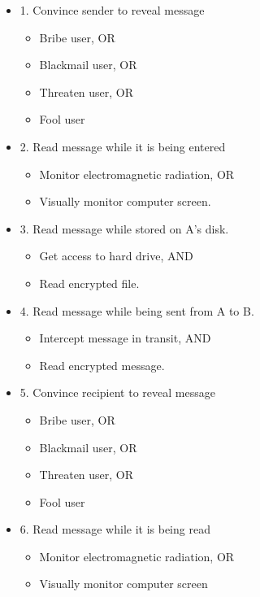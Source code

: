 \begin{itemize}
    \item 1. Convince sender to reveal message
        \begin{itemize}
            \item Bribe user, OR
            \item Blackmail user, OR
            \item Threaten user, OR
            \item Fool user
        \end{itemize}
    \item 2. Read message while it is being entered
        \begin{itemize}
            \item Monitor electromagnetic radiation, OR
            \item Visually monitor computer screen.
        \end{itemize}
    \item 3. Read message while stored on A’s disk.
        \begin{itemize}
            \item Get access to hard drive, AND
            \item Read encrypted file.
        \end{itemize}
    \item 4. Read message while being sent from A to B.
        \begin{itemize}
            \item Intercept message in transit, AND
            \item Read encrypted message.
        \end{itemize}
    \item 5. Convince recipient to reveal message
        \begin{itemize}
            \item Bribe user, OR
            \item Blackmail user, OR
            \item Threaten user, OR
            \item Fool user
        \end{itemize}
    \item 6. Read message while it is being read
        \begin{itemize}
            \item Monitor electromagnetic radiation, OR
            \item Visually monitor computer screen

\end{itemize}
\end{itemize}
